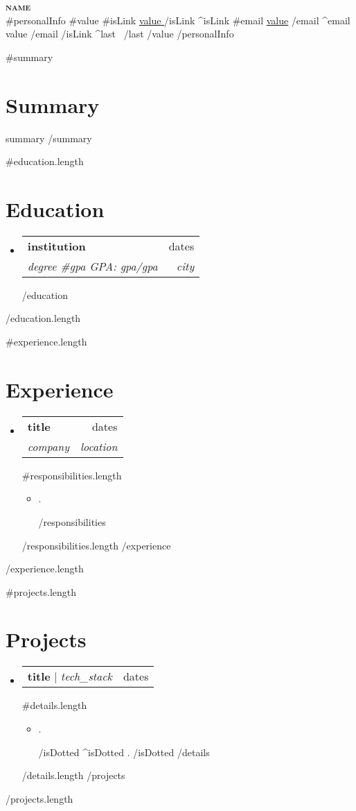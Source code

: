 \documentclass[letterpaper,11pt]{article}
\newcommand{\resumeDottedItem}[1]{
  \item\small{
    {#1 \vspace{-2pt}}
  }
}
\newcommand{\resumeParagraphItem}[1]{\small{
  {#1 \vspace{-2pt}}
}}
\newcommand{\resumeSubheading}[4]{
  \vspace{-2pt}\item
    \begin{tabularx}{\textwidth}{Xr}
      \textbf{#1} & #2 \\
      \textit{\small#3} & \textit{\small #4} \\
    \end{tabularx}\vspace{-6pt}
}
\newcommand{\resumeProjectHeading}[2]{
    \item
    \begin{tabularx}{\textwidth}{Xr}
      \small #1 & #2 \\
    \end{tabularx}\vspace{-6pt}
}
\newcommand{\resumeSubHeadingListStart}{
  \begin{itemize}[leftmargin=0.15in, label={}, itemsep=3pt, parsep=0pt, topsep=0pt]
}
\newcommand{\resumeSubHeadingListEnd}{\end{itemize}}
\newcommand{\resumeItemListStart}{
  \begin{itemize}[itemsep=2pt, parsep=0pt, topsep=0pt]
}
\newcommand{\resumeItemListEnd}{\end{itemize}\vspace{-8pt}}
\begin{document}
\begin{center}
    \textbf{\Huge \scshape {{name}}} \\ \vspace{1pt}
    \small
    {{#personalInfo}}
      {{#value}}
        {{#isLink}}
          \href{ {{{link}}} }{ \underline{ {{value}} } }
        {{/isLink}}
        {{^isLink}}
          {{#email}}
            \underline{{{value}}}
          {{/email}}
          {{^email}}
            {{value}}
          {{/email}}
        {{/isLink}}
        {{^last}} \textbar\ {{/last}}
      {{/value}}
    {{/personalInfo}}
\end{center}

{{#summary}}
\section{Summary}
{{summary}}
{{/summary}}

{{#education.length}}
\section{Education}
\resumeSubHeadingListStart
  {{#education}}
    \resumeSubheading
      { {{institution}} }{ {{dates}} }
      { {{degree}} {{#gpa}} GPA: {{gpa}}{{/gpa}} }{ {{city}} }
  {{/education}}
\resumeSubHeadingListEnd
{{/education.length}}

{{#experience.length}}
\section{Experience}
\resumeSubHeadingListStart
  {{#experience}}
    \resumeSubheading
      { {{title}} }{ {{dates}} }
      { {{company}} }{ {{location}} }
      {{#responsibilities.length}}
      \resumeItemListStart
        {{#responsibilities}}
          \resumeDottedItem{ {{.}} }
        {{/responsibilities}}
      \resumeItemListEnd
      {{/responsibilities.length}}
  {{/experience}}
\resumeSubHeadingListEnd
{{/experience.length}}

{{#projects.length}}
\section{Projects}
\resumeSubHeadingListStart
  {{#projects}}
    \resumeProjectHeading
      { \textbf{ {{title}} } $|$ \emph{ {{tech_stack}} } }{ {{dates}} }
      {{#details.length}}
      \resumeItemListStart
        {{#details}}
          {{#isDotted}}
            \resumeDottedItem{ {{.}} }
          {{/isDotted}}
          {{^isDotted}}
            \resumeParagraphItem{ {{.}} }
          {{/isDotted}}
        {{/details}}
      \resumeItemListEnd
      {{/details.length}}
  {{/projects}}
\resumeSubHeadingListEnd
{{/projects.length}}
\end{document}
